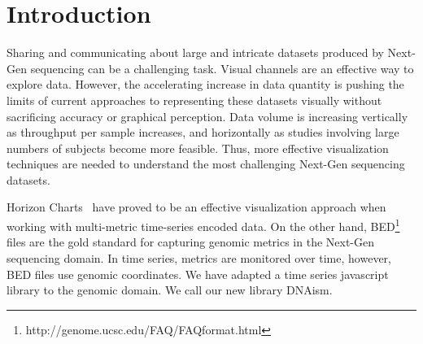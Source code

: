 \documentclass{bioinfo}
\begin{document}
\section{Introduction}

Sharing and communicating about large and intricate datasets produced by
Next-Gen sequencing can be a challenging task. Visual channels are an effective
way to explore data. However, the accelerating increase in data quantity is
pushing the limits of current approaches to representing these datasets
visually without sacrificing accuracy or graphical perception.  Data volume is
increasing vertically as throughput per sample increases, and horizontally as
studies involving large numbers of subjects become more feasible.  Thus, more
effective visualization techniques are needed to understand the most
challenging Next-Gen sequencing datasets.

Horizon Charts~\citep{time-in-the-horizon} have proved to be an effective
visualization approach when working with multi-metric time-series encoded data.
On the other hand, BED\footnote{http://genome.ucsc.edu/FAQ/FAQformat.html}
files are the gold standard for capturing genomic metrics in the Next-Gen
sequencing domain. In time series, metrics are monitored over time, however,
BED files use genomic coordinates. We have adapted a time series javascript
library to the genomic domain. We call our new library DNAism.
\end{document}
